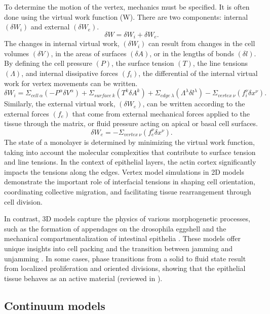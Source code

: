 To determine the motion of the vertex, mechanics must be specified. It is often done using the virtual work function (W). There are two components: internal $(\delta W_i)$ and external $(\delta W_e)$. 
$$ \delta W = \delta W_i + \delta W_e .$$ 
The changes in internal virtual work,  $(\delta W_i)$ can result from changes in the cell volumes $(\delta V)$, in the areas of surfaces $(\delta A)$, or in the lengths of bonds $(\delta l)$. By defining the cell pressure $(P)$, the surface tension $(T)$, the line tensions $(\Lambda)$, and internal dissipative forces $(f_i)$, the differential of the internal virtual work for vertex movements can be written. 
$$ \delta W_i = \Sigma_{cell\ \alpha} \left( -P^\alpha \delta V^\alpha \right) + \Sigma_{surface\ k} \left( T^k \delta A^k \right) + \Sigma_{edge\ \lambda} \left( \Lambda^\lambda \delta l^\lambda \right) - \Sigma_{vertex\ \nu} \left( f_i^\nu \delta x^\nu \right). $$
Similarly, the external virtual work, $(\delta W_e)$, can be written according to the external forces $(f_e)$ that come from external mechanical forces applied to the tissue through the matrix, or fluid pressure acting on apical or basal cell surfaces.
$$ \delta W_e =  - \Sigma_{vertex\ \nu} \left( f_e^\nu \delta x^\nu \right). $$
The state of a monolayer is determined by minimizing the virtual work function, taking into account the molecular complexities that contribute to surface tension and line tensions. In the context of epithelial layers, the actin cortex significantly impacts the tensions along the edges. Vertex model simulations in 2D models demonstrate the important role of interfacial tensions in shaping cell orientation, coordinating collective migration, and facilitating tissue rearrangement through cell division.

In contrast, 3D models capture the physics of various morphogenetic processes, such as the formation of appendages on the drosophila eggshell and the mechanical compartmentalization of intestinal epithelia \cite{osterfield2017, perez-gonzalez2021}. These models offer unique insights into cell packing and the transition between jamming and unjamming \cite{park2015, tang2022}. In some cases, phase transitions from a solid to fluid state result from localized proliferation and oriented divisions, showing that the epithelial tissue behaves as an active material (reviewed in \cite{lenne2022}).

\hypertarget{continuum-models}{%
	\subsection{Continuum models}\label{continuum-models}}

